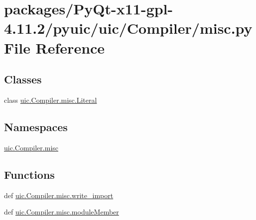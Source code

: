 \hypertarget{PyQt-x11-gpl-4_811_82_2pyuic_2uic_2Compiler_2misc_8py}{}\section{packages/\+Py\+Qt-\/x11-\/gpl-\/4.11.2/pyuic/uic/\+Compiler/misc.py File Reference}
\label{PyQt-x11-gpl-4_811_82_2pyuic_2uic_2Compiler_2misc_8py}
\subsection*{Classes}
\begin{DoxyCompactItemize}
\item 
class \hyperlink{classuic_1_1Compiler_1_1misc_1_1Literal}{uic.\+Compiler.\+misc.\+Literal}
\end{DoxyCompactItemize}
\subsection*{Namespaces}
\begin{DoxyCompactItemize}
\item 
 \hyperlink{namespaceuic_1_1Compiler_1_1misc}{uic.\+Compiler.\+misc}
\end{DoxyCompactItemize}
\subsection*{Functions}
\begin{DoxyCompactItemize}
\item 
def \hyperlink{namespaceuic_1_1Compiler_1_1misc_af53d27f23c0800656136be0d9988ad4d}{uic.\+Compiler.\+misc.\+write\+\_\+import}
\item 
def \hyperlink{namespaceuic_1_1Compiler_1_1misc_a8bf97869403c83f3a4b077654f31623a}{uic.\+Compiler.\+misc.\+module\+Member}
\end{DoxyCompactItemize}
